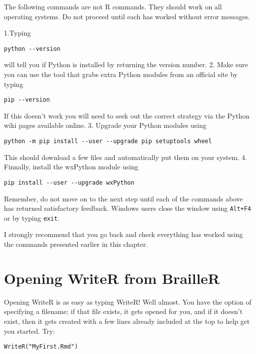 \documentclass[
]{book}
\begin{document}
The following commands are not R commands. They should work on all operating systems. Do not proceed until each has worked without error messages.

1.Typing

\begin{verbatim}
python --version
\end{verbatim}

will tell you if Python is installed by returning the version number.
2. Make sure you can use the tool that grabs extra Python modules from an official site by typing

\begin{verbatim}
pip --version
\end{verbatim}

If this doesn't work you will need to seek out the correct strategy via the Python wiki pages available online.
3. Upgrade your Python modules using

\begin{verbatim}
python -m pip install --user --upgrade pip setuptools wheel
\end{verbatim}

This should download a few files and automatically put them on your system.
4. Finnally, install the wxPython module using

\begin{verbatim}
pip install --user --upgrade wxPython
\end{verbatim}

Remember, do not move on to the next step until each of the commands above has returned satisfactory feedback. Windows users close the window using \texttt{Alt+F4} or by typing \texttt{exit}.

I strongly recommend that you go back and check everything has worked using the commands presented earlier in this chapter.

\hypertarget{opening-writer-from-brailler}{%
\section{Opening WriteR from BrailleR}\label{opening-writer-from-brailler}}

Opening WriteR is as easy as typing WriteR! Well almost. You have the option of specifying a filename; if that file exists, it gets opened for you, and if it doesn't exist, then it gets created with a few lines already included at the top to help get you started. Try:

\texttt{WriteR("MyFirst.Rmd")}
\end{document}
